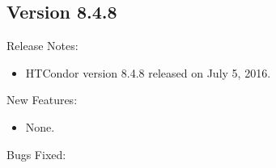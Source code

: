 \subsection*{\label{sec:New-8-4-8}Version 8.4.8}

\noindent Release Notes:

\begin{itemize}

\item HTCondor version 8.4.8 released on July 5, 2016.

\end{itemize}


\noindent New Features:

\begin{itemize}

\item None.

\end{itemize}

\noindent Bugs Fixed:

